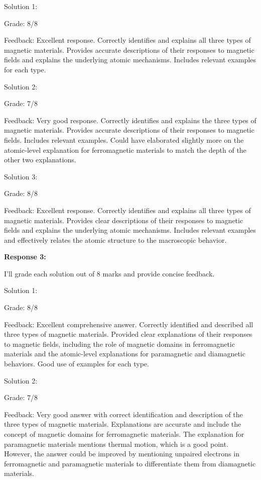 \documentclass[a4paper,11pt]{article}
\begin{document}
Solution 1:

Grade: 8/8

Feedback: Excellent response. Correctly identifies and explains all three types of magnetic materials. Provides accurate descriptions of their responses to magnetic fields and explains the underlying atomic mechanisms. Includes relevant examples for each type.

Solution 2:

Grade: 7/8

Feedback: Very good response. Correctly identifies and explains the three types of magnetic materials. Provides accurate descriptions of their responses to magnetic fields. Includes relevant examples. Could have elaborated slightly more on the atomic-level explanation for ferromagnetic materials to match the depth of the other two explanations.

Solution 3:

Grade: 8/8

Feedback: Excellent response. Correctly identifies and explains all three types of magnetic materials. Provides clear descriptions of their responses to magnetic fields and explains the underlying atomic mechanisms. Includes relevant examples and effectively relates the atomic structure to the macroscopic behavior.

\bigskip
\textbf{Response 3:}

I'll grade each solution out of 8 marks and provide concise feedback.

Solution 1:

Grade: 8/8

Feedback: Excellent comprehensive answer. Correctly identified and described all three types of magnetic materials. Provided clear explanations of their responses to magnetic fields, including the role of magnetic domains in ferromagnetic materials and the atomic-level explanations for paramagnetic and diamagnetic behaviors. Good use of examples for each type.

Solution 2:

Grade: 7/8

Feedback: Very good answer with correct identification and description of the three types of magnetic materials. Explanations are accurate and include the concept of magnetic domains for ferromagnetic materials. The explanation for paramagnetic materials mentions thermal motion, which is a good point. However, the answer could be improved by mentioning unpaired electrons in ferromagnetic and paramagnetic materials to differentiate them from diamagnetic materials.
\end{document}
